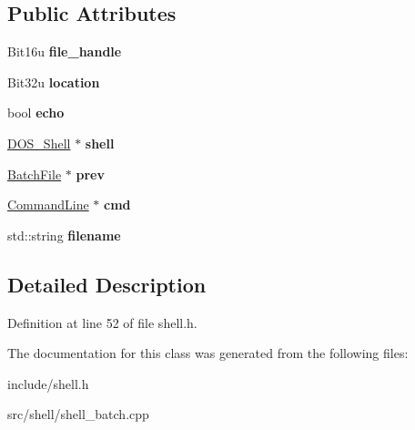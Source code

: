\subsection*{Public Attributes}
\begin{DoxyCompactItemize}
\item 
\hypertarget{classBatchFile_a0e668547306df551eb7e70baa98241e9}{Bit16u {\bfseries file\-\_\-handle}}\label{classBatchFile_a0e668547306df551eb7e70baa98241e9}

\item 
\hypertarget{classBatchFile_aa9209ce7918ced6ce1a2fc59fff4b0c9}{Bit32u {\bfseries location}}\label{classBatchFile_aa9209ce7918ced6ce1a2fc59fff4b0c9}

\item 
\hypertarget{classBatchFile_ac6faaf367cb17424acd15724a58448ab}{bool {\bfseries echo}}\label{classBatchFile_ac6faaf367cb17424acd15724a58448ab}

\item 
\hypertarget{classBatchFile_a739d699f3d7abf36ae6e85ebe80d80b0}{\hyperlink{classDOS__Shell}{D\-O\-S\-\_\-\-Shell} $\ast$ {\bfseries shell}}\label{classBatchFile_a739d699f3d7abf36ae6e85ebe80d80b0}

\item 
\hypertarget{classBatchFile_a6369bd4d3b07b7661e49aaf43f4ed622}{\hyperlink{classBatchFile}{Batch\-File} $\ast$ {\bfseries prev}}\label{classBatchFile_a6369bd4d3b07b7661e49aaf43f4ed622}

\item 
\hypertarget{classBatchFile_a2b1bcf8ea0fb7f71633708a9886e67ee}{\hyperlink{classCommandLine}{Command\-Line} $\ast$ {\bfseries cmd}}\label{classBatchFile_a2b1bcf8ea0fb7f71633708a9886e67ee}

\item 
\hypertarget{classBatchFile_a2deea964df7496637a1843c66d174189}{std\-::string {\bfseries filename}}\label{classBatchFile_a2deea964df7496637a1843c66d174189}

\end{DoxyCompactItemize}


\subsection{Detailed Description}


Definition at line 52 of file shell.\-h.



The documentation for this class was generated from the following files\-:\begin{DoxyCompactItemize}
\item 
include/shell.\-h\item 
src/shell/shell\-\_\-batch.\-cpp\end{DoxyCompactItemize}
